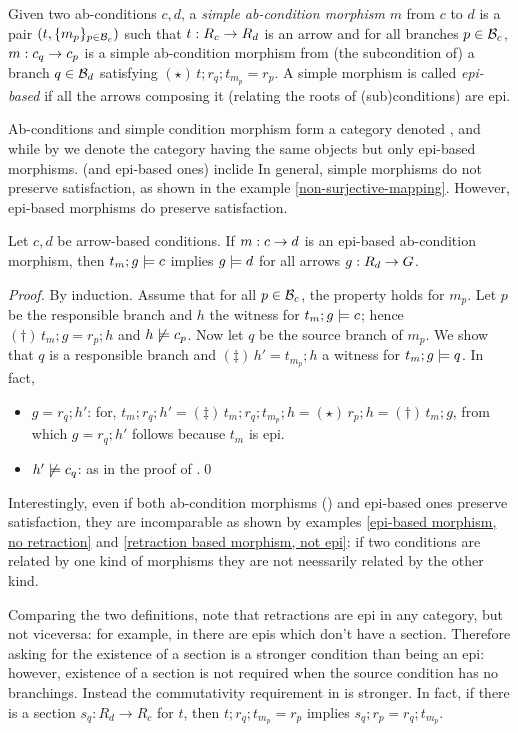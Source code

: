 \begin{definition}
  Given two ab-conditions $c,d$, a \emph{simple ab-condition morphism} $m$ from $c$ to $d$ is a pair $(t,\{{m_p}\}_{p\in \mathcal{B}_c})$ such that $t:R_c\rightarrow R_d$ is an arrow and for all branches $p\in \mathcal{B}_c$, $m:c_q\rightarrow c_p$ is a simple ab-condition morphism from (the subcondition of) a branch $q\in \mathcal{B}_d$ satisfying $(\star)\, t;r_q;t_{m_p}=r_p$. 
  A simple morphism is called \emph{epi-based} if all the arrows composing it (relating the roots of (sub)conditions) are epi. 
\end{definition}
%
Ab-conditions and simple condition morphism form a category denoted , and while by  we denote the category having the same objects but only epi-based morphisms.  (and epi-based ones) inclide
In general, simple morphisms do not preserve satisfaction, as shown in the example \ref{non-surjective-mapping}. However, epi-based morphisms do preserve satisfaction. 


\begin{proposition}
  Let $c,d$ be arrow-based conditions. If $m:c\rightarrow d$ is an epi-based ab-condition morphism, then $t_m;g\models c$ implies $g \models d$ for all arrows $g:R_d\rightarrow G$.
  \end{proposition}
  \emph{Proof.} By induction. Assume that for all $p\in \mathcal{B}_c$, the property holds for $m_p$. Let $p$ be the responsible branch and $h$ the witness for $t_m;g\models c$; hence $(\dagger)\, t_m;g=r_p;h$ and $h\not\models c_p$. Now let $q$ be the source branch of $m_p$. We show that $q$ is a responsible branch and $(\ddagger)\, h'=t_{m_p};h$ a witness for $t_m;g\models q$. In fact, 
  \begin{itemize}
  \item $g = r_q;h'$: for, $t_m;r_q;h' =\!(\ddagger)\, t_m;r_q;t_{m_p};h =\!(\star)\, r_p; h =\!(\dagger)\, t_m;g$, from which  $g = r_q;h'$ follows because $t_m$ is epi. 
  \item $h'\not\models c_q$: as in the proof of .\qed
  \end{itemize}

  Interestingly, even if both ab-condition morphisms () and epi-based ones preserve satisfaction, they are incomparable as shown by examples \ref{epi-based morphism, no retraction} and \ref{retraction based morphism, not epi}: if two conditions are related by one kind of morphisms they are not neessarily related by the other kind. 

  Comparing the two definitions, note that retractions are epi in any category, but not viceversa: for example, in  there are epis which don't have a section. Therefore asking for the existence of a section is a stronger condition than being an epi: however, existence of a section is not required when the source condition has no branchings. Instead the commutativity requirement in  is stronger. In fact, if there is a section $s_q: R_d \to R_c$ for $t$, then  $t;r_q;t_{m_p}=r_p$ implies $s_q; r_p = r_q ; t_{m_p}$. 
